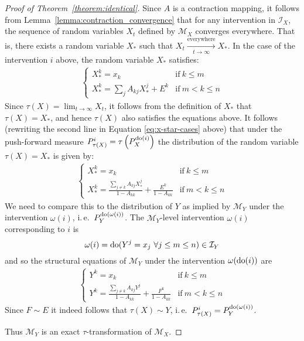 \begin{proof}[Proof of Theorem~\ref{theorem:identical}]
Since $A$ is a contraction mapping, it follows from Lemma~\ref{lemma:contraction_convergence} that for any intervention in $\mathcal{I}_X$, the sequence of random variables $X_t$ defined by $\mathcal{M}_X$ converges everywhere.
That is, there exists a random variable $X_*$ such that ${X_t \xrightarrow[t\to\infty]{\text{everywhere}} X_*}$.
In the case of the intervention $i$ above, the random variable $X_*$ satisfies:
\begin{align}\label{eq:x-star-cases}
\begin{cases}
X^k_{*} = x_k & \text{if}\  k \leq m \\
X^k_{*} = \sum_j A_{kj}X^j_{*} + E^k  & \text{if}\ m < k \leq n
\end{cases}
\end{align}
%
Since $\tau(X) = \lim_{t\rightarrow \infty}X_t$, it follows from the definition of $X_*$ that $\tau(X)= X_*$, and hence $\tau(X)$ also satisfies the equations above.
It follows (rewriting the second line in Equation \ref{eq:x-star-cases} above) that under the push-forward measure $P_{\tau(X)}^{i} = \tau\left(P_X^{\operatorname{do}(i)}\right)$ the distribution of the random variable $\tau(X)=X_*$ is given by:
%
\begin{align*}
\begin{cases}
X_*^k = x_k & \text{if}\ k \leq m \\
X_*^k = \frac{\sum_{j\neq k} A_{kj}X_*^j}{1-A_{kk}} + \frac{E^k}{1-A_{kk}} & \text{if}\ m < k \leq n
\end{cases}
\end{align*}
%
We need to compare this to the distribution of $Y$ as implied by $\mathcal{M}_Y$ under the intervention $\omega(i)$, i.\,e.\ $P_Y^{\operatorname{do}(\omega(i))}$.
The $\mathcal{M}_Y$-level intervention $\omega(i)$ corresponding to $i$ is
\[ \omega(i) = \operatorname{do}(Y^j=x_j\ \forall j\leq m\leq n) \in \mathcal{I}_Y \]
and so the structural equations of $\mathcal{M}_Y$ under the intervention $\omega(\operatorname{do}(i))$ are
%
\begin{align*}
\begin{cases}
Y^k = x_k  & \text{if}\ k\leq m \\
Y^k = \frac{\sum_{j\neq k} A_{kj}Y^j}{1-A_{kk}} + \frac{F^k}{1-A_{kk}}  & \text{if}\ m <  k \leq n
\end{cases}
\end{align*}
%
Since $F\sim E$ it indeed follows that $\tau(X) \sim Y$, i.\,e.\ $P_{\tau(X)}^{i} = P_Y^{\operatorname{do}(\omega(i))}$.

Thus $\mathcal{M}_Y$ is an exact $\tau$-transformation of $\mathcal{M}_X$.
\end{proof}







